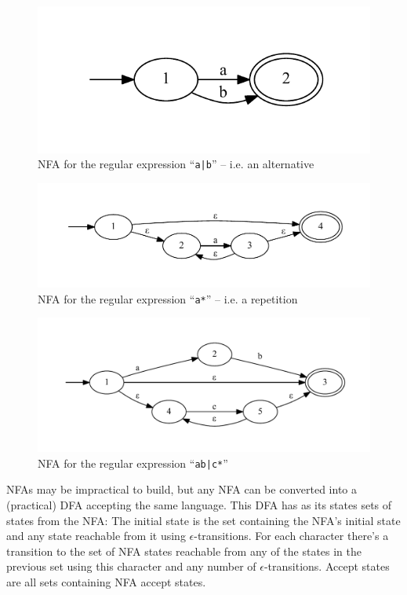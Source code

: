 			\begin{figure}
			\centering
			\includegraphics{figures/re_alternative}
			\caption{NFA for the regular expression ``\lstinline$a|b$'' -- i.e. an alternative}
			\label{fig:re_nfa_alternative}
			\end{figure}
			
			\begin{figure}
			\centering
			\includegraphics[width=\textwidth]{figures/re_kleene}
			\caption{NFA for the regular expression ``\lstinline$a*$'' -- i.e. a repetition}
			\label{fig:re_nfa_kleene}
			\end{figure}
			
			\begin{figure}
			\centering
			\includegraphics[width=\textwidth]{figures/re_example}
			\caption{NFA for the regular expression ``\lstinline$ab|c*$''}
			\label{fig:re_nfa_example}
			\end{figure}
			
			NFAs may be impractical to build, but any NFA can be converted into a (practical) DFA accepting the same language. This DFA has as its states sets of states from the NFA: The initial state is the set containing the NFA's initial state and any state reachable from it using $\epsilon$-transitions. For each character there's a transition to the set of NFA states reachable from any of the states in the previous set using this character and any number of $\epsilon$-transitions. Accept states are all sets containing NFA accept states.
			
